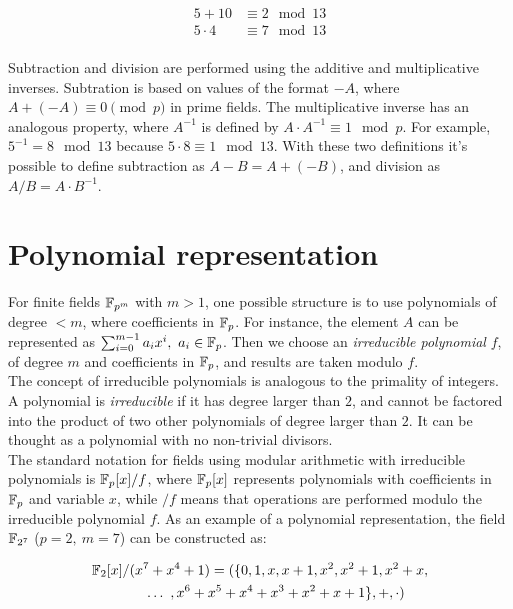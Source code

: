 \begin{align*}
5 + 10 &\equiv 2 \mod 13 \\
5 \cdot 4 &\equiv 7 \mod 13 \\
\end{align*}

Subtraction and division are performed using the additive and multiplicative inverses. Subtration is based on values of the format $-A$, where $A + (-A) \equiv 0 \pmod p$ in prime fields. The multiplicative inverse has an analogous property, where $A^{-1}$ is defined by $A \cdot A^{-1} \equiv 1 \mod p$. For example, $5^{-1} = 8 \mod 13$ because $5 \cdot 8 \equiv 1 \mod 13$. With these two definitions it's possible to define subtraction as $A - B = A + (-B)$, and division as $A / B = A \cdot B^{-1}$.

\section{Polynomial representation} \label{background:polynomial_representation}

For finite fields $\mathbb{F}_{p^m}$ with $m > 1$, one possible structure is to use polynomials of degree $<m$, where coefficients in $\mathbb{F}_{p}$. For instance, the element $A$ can be represented as $\sum_{i=0}^{m-1} a_i x^i,~a_i \in \mathbb{F}_{p}$. Then we choose an \emph{irreducible polynomial} $f$, of degree $m$ and coefficients in $\mathbb{F}_{p}$, and results are taken modulo $f$.\\

The concept of irreducible polynomials is analogous to the primality of integers. A polynomial is \emph{irreducible} if it has degree larger than $2$, and cannot be factored into the product of two other polynomials of degree larger than $2$. It can be thought as a polynomial with no non-trivial divisors.\\

The standard notation for fields using modular arithmetic with irreducible polynomials is $\mathbb{F}_p[x]/f$, where $\mathbb{F}_p[x]$ represents polynomials with coefficients in $\mathbb{F}_p$ and variable $x$, while $/f$ means that operations are performed modulo the irreducible polynomial $f$. As an example of a polynomial representation, the field $\mathbb{F}_{2^7}$ ($p=2,~m=7$) can be constructed as:

\begin{gather*}
\mathbb{F}_{2}[x]/(x^7+x^4+1) = (\{0, 1, x, x+1, x^2, x^2+1, x^2+x, \\
\hspace{8mm} \ldots~, x^6+x^5+x^4+x^3+x^2+x+1\}, +, \cdot)
\end{gather*}

